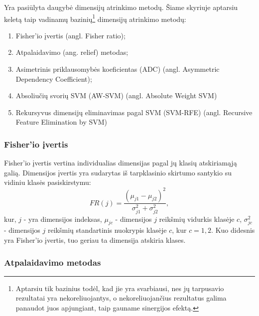 Yra pasiūlyta daugybė dimensijų atrinkimo metodų. Šiame skyriuje aptarsiu
keletą taip vadinamų bazinių\footnote{Aptarsiu tik bazinius todėl, kad jie yra 
svarbiausi, nes jų tarpusavio rezultatai yra nekoreliuojantys, o nekoreliuojančius
rezultatus galima panaudot juos apjungiant, taip gauname sinergijos efektą.}
dimensijų atrinkimo metodų: 
\begin{enumerate}
 \item Fisher'io įvertis (angl. Fisher ratio)\cite{Pavlidis:2001:GFC:369133.369228};
 \item Atpalaidavimo (ang. relief) metodas\cite{DBLP:journals/ml/Robnik-SikonjaK03};
 \item Asimetrinis priklausomybės koeficientas\cite{Shannon:2001:MTC:584091.584093} (ADC) (angl.
 Asymmetric Dependency Coefficient);
 \item Absoliučių svorių SVM\cite{vapnik2000nature} (AW-SVM) (angl. Absolute Weight SVM)
 \item Rekursyvus dimensijų eliminavimas pagal SVM\cite{Guyon:2002:GSC:599613.599671} (SVM-RFE) (angl. Recursive
 Feature Elimination by SVM)
\end{enumerate}

\subsubsection{Fisher'io įvertis}

Fisher'io įvertis vertina individualias dimensijas pagal jų klasių atskiriamąją 
galią. Dimensijos įvertis yra sudarytas iš tarpklasinio skirtumo santykio su 
vidiniu klasės pasiskirstymu:
\begin{equation}
 FR(j) = \frac{(\mu_{j1} - \mu_{j2})^2}{\sigma_{j1}^2 + \sigma_{j2}^2},
\end{equation}
kur, $j$ - yra dimensijos indeksas, $\mu_{jc}$ - dimensijos $j$ reikšmių vidurkis
klasėje $c$, $\sigma_{jc}^2$ - dimensijos $j$ reikšmių standartinis nuokrypis
klasėje $c$, kur $c={1,2}$. Kuo didesnis yra Fisher'io įvertis, tuo geriau ta
dimensija atskiria klases.

\subsubsection{Atpalaidavimo metodas}


